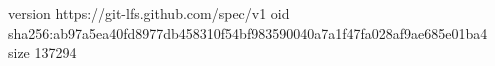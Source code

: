 version https://git-lfs.github.com/spec/v1
oid sha256:ab97a5ea40fd8977db458310f54bf983590040a7a1f47fa028af9ae685e01ba4
size 137294
